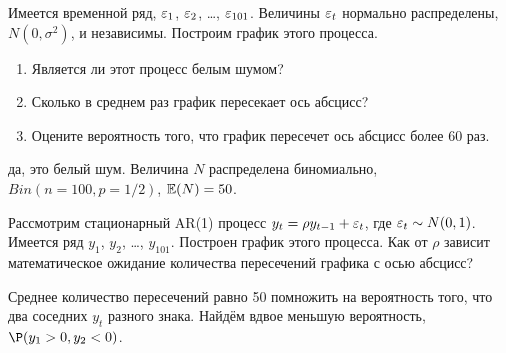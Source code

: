 \begin{problem}
Имеется временной ряд, $\varepsilon_1$, $\varepsilon_2$, \ldots, $\varepsilon_{101}$. Величины $\varepsilon_t$ нормально распределены, $N(0,\sigma^2)$, и независимы. Построим график этого процесса.
\begin{enumerate}
\item Является ли этот процесс белым шумом?
\item Сколько в среднем раз график пересекает ось абсцисс?
\item Оцените вероятность того, что график пересечет ось абсцисс более 60 раз.
\end{enumerate}



\begin{sol}
да, это белый шум. Величина $N$ распределена биномиально, $Bin(n=100,p=1/2)$, $\mathbb{E}(N)=50$.
\end{sol}
\end{problem}


\begin{problem}
Рассмотрим стационарный AR(1) процесс $y_t=\rho y_{t-1} + \varepsilon_t$, где $\varepsilon_t \sim N(0,1)$. Имеется ряд $y_1$, $y_2$, \ldots, $y_{101}$. Построен график этого процесса. Как от $\rho$ зависит математическое ожидание количества пересечений графика с осью абсцисс?


\begin{sol}
Среднее количество пересечений равно 50 помножить на вероятность того, что два соседних $y_t$ разного знака. Найдём вдвое меньшую вероятность, $\P(y_1>0, y_2 <0)$.
\end{sol}
\end{problem}



